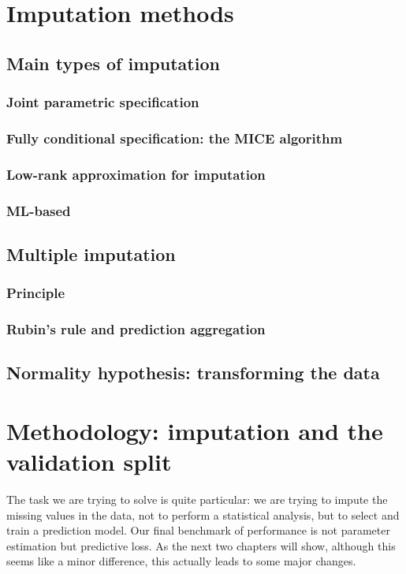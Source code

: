 \documentclass[12pt, a4paper]{memoir}
\begin{document}
\chapter{Imputation methods}
\label{imputation}
	\section{Main types of imputation}
		\subsection{Joint parametric specification}
		\subsection{Fully conditional specification: the MICE algorithm}
		\subsection{Low-rank approximation for imputation}
		\subsection{ML-based}
	\section{Multiple imputation}
		\subsection{Principle}
		\subsection{Rubin's rule and prediction aggregation}
	\section{Normality hypothesis: transforming the data}
		
\chapter{Methodology: imputation and the validation split}
\label{validation}
The task we are trying to solve is quite particular: we are trying to impute the missing values in the data, not to perform a statistical analysis, but to select and train a prediction model. Our final benchmark of performance is not parameter estimation but predictive loss. As the next two chapters will show, although this seems like a minor difference, this actually leads to some major changes.
\end{document}
